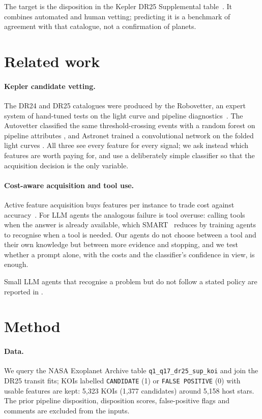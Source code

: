 \documentclass[11pt,a4paper]{article}
\newcommand{\code}[1]{\texttt{#1}}
\begin{document}
The target is the disposition in the Kepler DR25 Supplemental table~\cite{thompson2018dr25,nea2018koidr25}. It
combines automated and human vetting; predicting it is a benchmark of agreement with that catalogue, not a
confirmation of planets.

\section{Related work}

\paragraph{Kepler candidate vetting.} The DR24 and DR25 catalogues were produced by the Robovetter, an expert system
of hand-tuned tests on the light curve and pipeline diagnostics~\cite{coughlin2016dr24,thompson2018dr25}. The
Autovetter classified the same threshold-crossing events with a random forest on pipeline attributes
\cite{mccauliff2015autovetter}, and Astronet trained a convolutional network on the folded light curves
\cite{shallue2018astronet}. All three see every feature for every signal; we ask instead which features are worth
paying for, and use a deliberately simple classifier so that the acquisition decision is the only variable.

\paragraph{Cost-aware acquisition and tool use.} Active feature acquisition buys features per instance to trade
cost against accuracy~\cite{saar2009afa,aronsson2026afa}. For LLM agents the analogous failure is tool overuse:
calling tools when the answer is already available, which SMART~\cite{qian2025smart} reduces by training agents to
recognise when a tool is needed. Our agents do not choose between a tool and their own knowledge but between more
evidence and stopping, and we test whether a prompt alone, with the costs and the classifier's confidence in view, is
enough.

Small LLM agents that recognise a problem but do not follow a stated policy are reported in \cite{hussain2026ecorecord}.

\section{Method}

\paragraph{Data.} We query the NASA Exoplanet Archive table \code{q1\_q17\_dr25\_sup\_koi} and join the DR25 transit
fits; KOIs labelled \code{CANDIDATE} (1) or \code{FALSE POSITIVE} (0) with usable features are kept: 5,323 KOIs
(1,377 candidates) around 5,158 host stars. The prior pipeline disposition, disposition scores, false-positive flags
and comments are excluded from the inputs.
\end{document}
